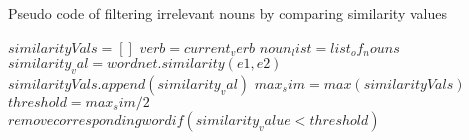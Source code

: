 \documentclass[a4paper,11pt]{article}
\begin{document}
 
\begin{algorithm}
    \caption{Pseudo code of filtering irrelevant nouns by comparing similarity values}
    \begin{algorithmic}[1]
        \State $similarityVals = []$
        \State $verb = current_verb$
        \State $noun_list = list_of_nouns$
            \State $similarity_val = wordnet.similarity(e1, e2)$
            \State $similarityVals.append(similarity_val)$
        \EndFor
        \State $max_sim = max( similarityVals )$
        \State $threshold = max_sim / 2$
            \State $remove corresponding word if (similarity_value < threshold)$
        \EndFor
    \end{algorithmic}
\end{algorithm}
\end{document}
